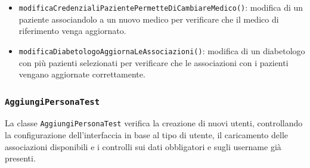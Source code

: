 \begin{itemize}
	\item \texttt{modificaCredenzialiPazientePermetteDiCambiareMedico()}: modifica di un paziente associandolo a un nuovo medico per verificare che il medico di riferimento venga aggiornato.
	
	\item \texttt{modificaDiabetologoAggiornaLeAssociazioni()}: modifica di un diabetologo con più pazienti selezionati per verificare che le associazioni con i pazienti vengano aggiornate correttamente.
	
\end{itemize}

\subsubsection*{\texttt{AggiungiPersonaTest}}

La classe \texttt{AggiungiPersonaTest} verifica la creazione di nuovi utenti, controllando la configurazione dell'interfaccia in base al tipo di utente, il caricamento delle associazioni disponibili e i controlli sui dati obbligatori e sugli username già presenti.

